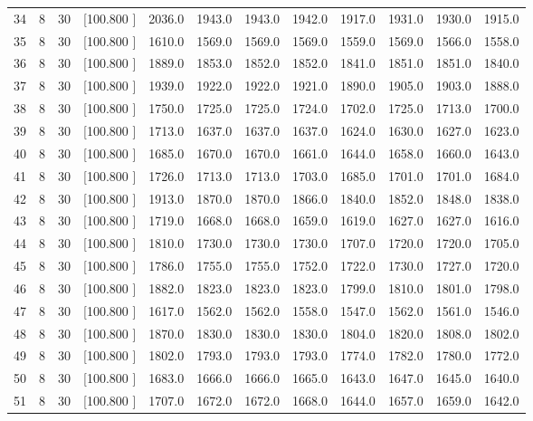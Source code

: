 \documentclass[12pt,a4paper]{article}
\begin{document}
\begin{center}
{\begin{tabular}{r r r r r r r r r r r r}
  34&  8& 30&[100.800   ]&  2036.0&  1943.0&  1943.0&  1942.0&  1917.0&  1931.0&  1930.0&  1915.0\\[-0.02in]
  35&  8& 30&[100.800   ]&  1610.0&  1569.0&  1569.0&  1569.0&  1559.0&  1569.0&  1566.0&  1558.0\\[-0.02in]
  36&  8& 30&[100.800   ]&  1889.0&  1853.0&  1852.0&  1852.0&  1841.0&  1851.0&  1851.0&  1840.0\\[-0.02in]
  37&  8& 30&[100.800   ]&  1939.0&  1922.0&  1922.0&  1921.0&  1890.0&  1905.0&  1903.0&  1888.0\\[-0.02in]
  38&  8& 30&[100.800   ]&  1750.0&  1725.0&  1725.0&  1724.0&  1702.0&  1725.0&  1713.0&  1700.0\\[-0.02in]
  39&  8& 30&[100.800   ]&  1713.0&  1637.0&  1637.0&  1637.0&  1624.0&  1630.0&  1627.0&  1623.0\\[-0.02in]
  40&  8& 30&[100.800   ]&  1685.0&  1670.0&  1670.0&  1661.0&  1644.0&  1658.0&  1660.0&  1643.0\\[-0.02in]
  41&  8& 30&[100.800   ]&  1726.0&  1713.0&  1713.0&  1703.0&  1685.0&  1701.0&  1701.0&  1684.0\\[-0.02in]
  42&  8& 30&[100.800   ]&  1913.0&  1870.0&  1870.0&  1866.0&  1840.0&  1852.0&  1848.0&  1838.0\\[-0.02in]
  43&  8& 30&[100.800   ]&  1719.0&  1668.0&  1668.0&  1659.0&  1619.0&  1627.0&  1627.0&  1616.0\\[-0.02in]
  44&  8& 30&[100.800   ]&  1810.0&  1730.0&  1730.0&  1730.0&  1707.0&  1720.0&  1720.0&  1705.0\\[-0.02in]
  45&  8& 30&[100.800   ]&  1786.0&  1755.0&  1755.0&  1752.0&  1722.0&  1730.0&  1727.0&  1720.0\\[-0.02in]
  46&  8& 30&[100.800   ]&  1882.0&  1823.0&  1823.0&  1823.0&  1799.0&  1810.0&  1801.0&  1798.0\\[-0.02in]
  47&  8& 30&[100.800   ]&  1617.0&  1562.0&  1562.0&  1558.0&  1547.0&  1562.0&  1561.0&  1546.0\\[-0.02in]
  48&  8& 30&[100.800   ]&  1870.0&  1830.0&  1830.0&  1830.0&  1804.0&  1820.0&  1808.0&  1802.0\\[-0.02in]
  49&  8& 30&[100.800   ]&  1802.0&  1793.0&  1793.0&  1793.0&  1774.0&  1782.0&  1780.0&  1772.0\\[-0.02in]
  50&  8& 30&[100.800   ]&  1683.0&  1666.0&  1666.0&  1665.0&  1643.0&  1647.0&  1645.0&  1640.0\\[-0.02in]
  51&  8& 30&[100.800   ]&  1707.0&  1672.0&  1672.0&  1668.0&  1644.0&  1657.0&  1659.0&  1642.0\\[-0.02in]

\end{tabular}}
\end{center}
\end{document}
